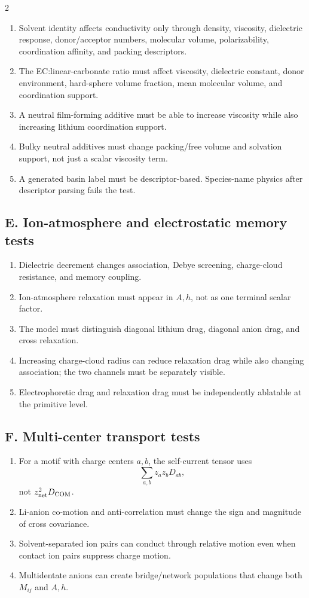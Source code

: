 \documentclass[10pt]{article}
\begin{document}
\begin{multicols}{2}
\begin{enumerate}
\item Solvent identity affects conductivity only through density, viscosity,
dielectric response, donor/acceptor numbers, molecular volume, polarizability,
coordination affinity, and packing descriptors.
\item The EC:linear-carbonate ratio must affect viscosity, dielectric constant,
donor environment, hard-sphere volume fraction, mean molecular volume, and
coordination support.
\item A neutral film-forming additive must be able to increase viscosity while
also increasing lithium coordination support.
\item Bulky neutral additives must change packing/free volume and solvation
support, not just a scalar viscosity term.
\item A generated basin label must be descriptor-based. Species-name physics
after descriptor parsing fails the test.
\end{enumerate}

\subsection{E. Ion-atmosphere and electrostatic memory tests}

\begin{enumerate}
\item Dielectric decrement changes association, Debye screening,
charge-cloud resistance, and memory coupling.
\item Ion-atmosphere relaxation must appear in \(A,h\), not as one terminal
scalar factor.
\item The model must distinguish diagonal lithium drag, diagonal anion drag, and
cross relaxation.
\item Increasing charge-cloud radius can reduce relaxation drag while also
changing association; the two channels must be separately visible.
\item Electrophoretic drag and relaxation drag must be independently ablatable
at the primitive level.
\end{enumerate}

\subsection{F. Multi-center transport tests}

\begin{enumerate}
\item For a motif with charge centers \(a,b\), the self-current tensor uses
\[
\sum_{a,b}z_az_bD_{ab},
\]
not \(z_{\rm net}^2D_{\rm COM}\).
\item Li-anion co-motion and anti-correlation must change the sign and magnitude
of cross covariance.
\item Solvent-separated ion pairs can conduct through relative motion even when
contact ion pairs suppress charge motion.
\item Multidentate anions can create bridge/network populations that change
both \(M_{ij}\) and \(A,h\).
\end{enumerate}


\end{multicols}
\end{document}

